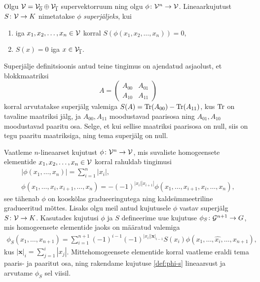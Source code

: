 \begin{dfn}
    Olgu $\mathcal{V} = \mathcal{V}_{\overline{0}} \oplus \mathcal{V}_{\overline{1}}$
    supervektorruum ning olgu $\phi \colon \mathcal{V}^n \to \mathcal{V}$.
    Lineaarkujutust $S \colon \mathcal{V} \to K$ nimetatakse $\phi$
    \emph{superjäljeks}, kui
    \begin{enumerate}[label=\arabic*)]
        \item iga $x_1, x_2, \dots, x_n \in \mathcal{V}$ korral
            $S\left(\phi(x_1, x_2, \dots, x_n)\right) = 0$,
        \item $S(x) = 0$ iga $x \in \mathcal{V}_{\overline{1}}$.
    \end{enumerate}
\end{dfn}

\begin{markus}
    Superjälje definitsioonis antud teine tingimus on ajendatud
    asjaolust, et blokkmaatriksi
    \[
        A = \begin{pmatrix}
            A_{00} & A_{01} \\
            A_{10} & A_{11}
        \end{pmatrix}
    \]
    korral arvutatakse superjälg valemiga
    $S(A) = \operatorname{Tr}(A_{00}) - \operatorname{Tr}(A_{11})$, kus $\operatorname{Tr}$ on tavaline
    maatriksi jälg, ja $A_{00}, A_{11}$ moodustavad paarisosa
    ning $A_{01}, A_{10}$ moodustavad paaritu
    osa. Selge, et kui sellise maatriksi paarisosa on null, siis
    on tegu paaritu maatriksiga, ning tema superjälg on null.
\end{markus}

Vaatleme $n$-lineaarset kujutust $\phi \colon \mathcal{V}^n \to \mathcal{V}$, mis
suvaliste homogeensete elementide $x_1, x_2, \dots, x_n \in \mathcal{V}$ korral
rahuldab tingimusi
\begin{gather}
    |\phi(x_1, \dots, x_n)| = \sum_{i=1}^n |x_i|,
        \label{eq:phi-grading}\\
    \phi \left( x_1, \dots, x_i, x_{i+1}, \dots, x_n \right) =
        -(-1)^{ |x_i| |x_{i+1}| } \phi \left(
            x_1, \dots, x_{i+1}, x_i, \dots, x_n
        \right), \label{eq:phi-graded-anticomm}
\end{gather}
see tähenab $\phi$ on kooskõlas gradueeringutega ning
kaldsümmeetriline gradueeritud mõttes. Lisaks olgu meil antud
kujutusele $\phi$ vastav superjälg $S \colon \mathcal{V} \to K$.
Kasutades kujutusi $\phi$ ja $S$ defineerime uue kujutuse
$\phi_S \colon \mathcal{G}^{n+1} \to G$, mis homogeensete elementide
jaoks on määratud valemiga
\begin{align}\label{def:phi-s}
    \phi_S (x_1, \dots, x_{n+1}) =
    \sum_{i=1}^{n+1} (-1)^{i-1}(-1)^{|x_i| |\mathbf{x}|_{i-1} }
        S(x_i) \phi \left(
            x_1, \dots, \hat{x_i}, \dots, x_{n+1}
        \right),
\end{align}
kus $|\mathbf{x}|_{i} = \sum_{j=1}^{i} |x_j|$.
Mittehomogeensete elementide korral vaatleme eraldi tema paaris- ja
paaritut osa, ning rakendame kujutuse \eqref{def:phi-s} lineaarsust
ja arvutame $\phi_S$ sel viisil.

